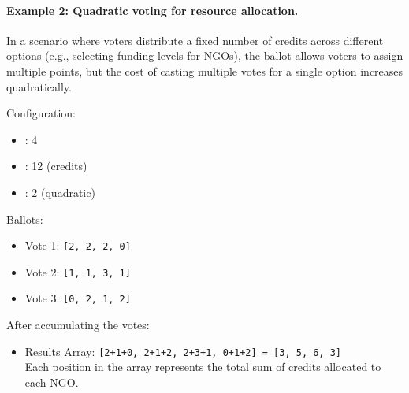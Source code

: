 
\paragraph{Example 2: Quadratic voting for resource allocation.} 

In a scenario where voters distribute a fixed number of credits across different options (e.g., selecting funding levels for NGOs), the ballot allows voters to assign multiple points, but the cost of casting multiple votes for a single option increases quadratically.

Configuration:

\begin{itemize}
	\item \maxcount: 4
	\item \maxtotalcost: 12 (credits)
	\item \costexponent: 2 (quadratic)
\end{itemize}

Ballots:

\begin{itemize}
	\item Vote 1: \texttt{[2, 2, 2, 0]}
	\item Vote 2: \texttt{[1, 1, 3, 1]}
	\item Vote 3: \texttt{[0, 2, 1, 2]}
\end{itemize}



After accumulating the votes:


\begin{itemize}
	\item Results Array: \texttt{[2+1+0, 2+1+2, 2+3+1, 0+1+2] = [3, 5, 6, 3]} \\
	Each position in the array represents the total sum of credits allocated to each NGO.
\end{itemize}

